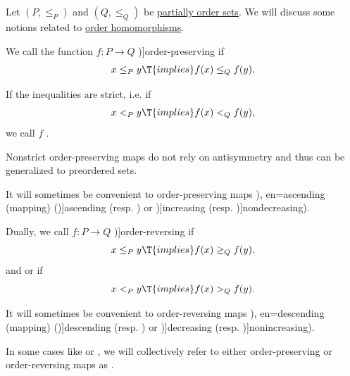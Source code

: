 \begin{definition}\label{def:order_function}\mimprovised
  Let \( (P, \leq_P) \) and \( (Q, \leq_Q) \) be \hyperref[def:partially_ordered_set]{partially order sets}. We will discuss some notions related to \hyperref[def:partially_ordered_set]{order homomorphisms}.

  \begin{thmenum}
    \mimprovised We call the function \( f: P \to Q \) \term[en=order-preserving (map) (\cite[def. 1.34]{DaveyPriestley2002LatticeTheory})]{order-preserving} if
    \begin{equation}\label{eq:def:order_function/preserving}
      x \leq_P y \T{implies} f(x) \leq_Q f(y).
    \end{equation}

    If the inequalities are strict, i.e. if
    \begin{equation}\label{eq:def:order_function/preserving/strict}
      x <_P y \T{implies} f(x) <_Q f(y),
    \end{equation}
    we call \( f \) .

    Nonstrict order-preserving maps do not rely on antisymmetry and thus can be generalized to preordered sets.

    It will sometimes be convenient to order-preserving maps \term[ru=возрастающая (функция) (\cite[\S 47]{Фихтенгольц1968ОсновыАнализаТом1}), en=ascending (mapping) (\cite[def. 1.9.2]{Harzheim2005OrderedSets})]{ascending} (resp. ) or \term[en=increasing (mapping) (\cite[def. 1.9.2]{Harzheim2005OrderedSets})]{increasing} (resp. \term[ru=неубывающая (функция) (\cite[\S 47]{Фихтенгольц1968ОсновыАнализаТом1})]{nondecreasing}).

     Dually, we call \( f: P \to Q \) \term[en=order-reversing map (\cite[\S 3.17]{Schechter1997AnalysisHandbook})]{order-reversing} if
    \begin{equation}\label{eq:def:order_function/reversing}
      x \leq_P y \T{implies} f(x) \geq_Q f(y).
    \end{equation}
    and or  if
    \begin{equation}\label{eq:def:order_function/reversing/strict}
      x <_P y \T{implies} f(x) >_Q f(y).
    \end{equation}

    It will sometimes be convenient to order-reversing maps \term[ru=убывающая (функция) (\cite[\S 47]{Фихтенгольц1968ОсновыАнализаТом1}), en=descending (mapping) (\cite[def. 1.9.2]{Harzheim2005OrderedSets})]{descending} (resp. ) or \term[en=decreasing (mapping) (\cite[def. 1.9.2]{Harzheim2005OrderedSets})]{decreasing} (resp. \term[ru=невозрастающая (функция) (\cite[\S 47]{Фихтенгольц1968ОсновыАнализаТом1})]{nonincreasing}).

     In some cases like  or , we will collectively refer to either order-preserving or order-reversing maps as .
  \end{thmenum}
\end{definition}

